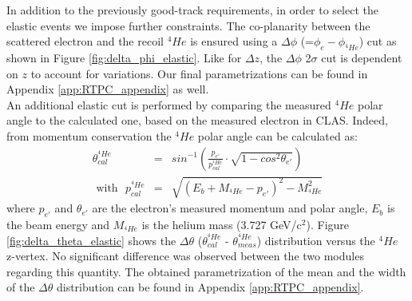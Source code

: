  In addition to the previously good-track requirements, in order to select the elastic events we impose further constraints. The co-planarity between the scattered electron and the recoil $^4He$ is ensured using a $\Delta \phi$ (=$\phi_{e}-\phi_{^{4}He}$) cut as shown in Figure \ref{fig:delta_phi_elastic}. Like for $\Delta z$, the $\Delta \phi$ 2$\sigma$ cut is dependent on $z$ to account for variations. Our final parametrizations can be found in Appendix \ref{app:RTPC_appendix} as well.\\

An additional elastic cut is performed by comparing the measured $^4He$ polar angle to the calculated one, based on the measured electron in CLAS. Indeed, from momentum conservation the $^4He$ polar angle can be calculated as:
\begin{eqnarray}
\theta^{^4He}_{cal} &=&  sin^{-1}\left(\frac{p_{e'}}{p^{^4He}_{cal}} \cdot \sqrt{1-cos^{2}\theta_{e'}}\right) \\
\text{ with~~} p^{^4He}_{cal} &=& \sqrt{(E_{b} + M_{^4He} - p_{e'})^{2} - M^{2}_{^4He}}
\label{equ:theta_helium}
\end{eqnarray}
where $p_{e'}$ and $\theta_{e'}$ are the electron's measured momentum and polar angle, $E_{b}$ is the beam energy and $M_{^4He}$ is the helium mass (3.727 GeV/c$^{2}$). Figure \ref{fig:delta_theta_elastic} shows the $\Delta \theta$ ($\theta^{^4He}_{cal}$ - $\theta^{^4He}_{meas}$) distribution versus the $^4He$ z-vertex. No significant difference was observed between the two modules regarding this quantity. The obtained parametrization of the mean and the width of the $\Delta \theta$  distribution can be found in Appendix \ref{app:RTPC_appendix}.\\

